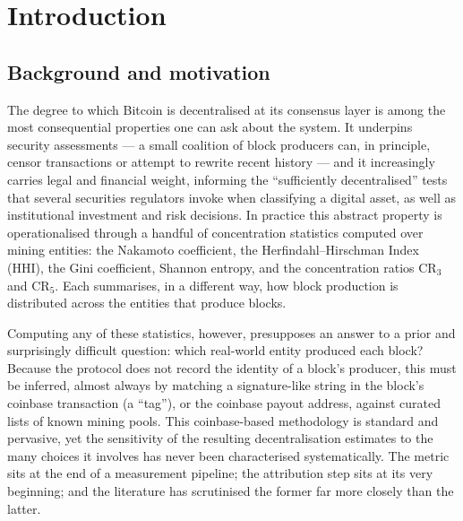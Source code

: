 \documentclass[logo,msc]{infthesis}           %
\begin{document}
\chapter{Introduction}
\label{ch:intro}
 
\section{Background and motivation}
\label{sec:intro-motivation}
 
The degree to which Bitcoin is decentralised at its consensus layer is among
the most consequential properties one can ask about the system. It underpins
security assessments --- a small coalition of block producers can, in
principle, censor transactions or attempt to rewrite recent history --- and it
increasingly carries legal and financial weight, informing the ``sufficiently
decentralised'' tests that several securities regulators invoke when
classifying a digital asset, as well as institutional investment and risk
decisions. In practice this abstract property is operationalised through a
handful of concentration statistics computed over mining entities: the
Nakamoto coefficient, the Herfindahl--Hirschman Index (HHI), the Gini
coefficient, Shannon entropy, and the concentration ratios $\mathrm{CR}_3$ and
$\mathrm{CR}_5$. Each summarises, in a different way, how block production is
distributed across the entities that produce blocks.
 
Computing any of these statistics, however, presupposes an answer to a prior
and surprisingly difficult question: which real-world entity produced each
block? Because the protocol does not record the identity of a block's
producer, this must be inferred, almost always by matching a
signature-like string in the block's coinbase transaction (a ``tag''), or the
coinbase payout address, against curated lists of known mining pools. This
coinbase-based methodology is standard and pervasive, yet the sensitivity of
the resulting decentralisation estimates to the many choices it involves has
never been characterised systematically. The metric sits at the end of a
measurement pipeline; the attribution step sits at its very beginning; and the
literature has scrutinised the former far more closely than the latter.
 
\end{document}
